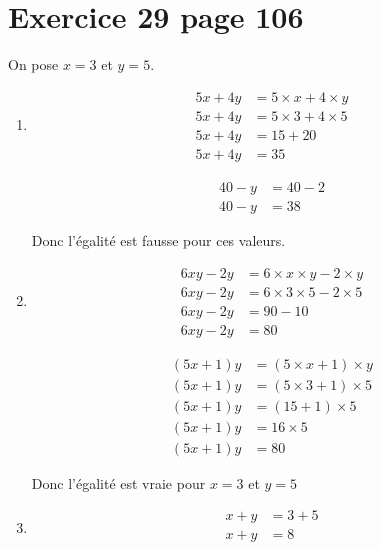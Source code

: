 \documentclass[12pt,a4paper]{article}
\begin{document}
\section*{Exercice 29 page 106}

On pose $x=3$ et $y=5$.

\begin{enumerate}
	\item 
	

	
	\begin{multicols}{2}
		\begin{align*}
			5x + 4y &= 5 \times x + 4 \times y \\
			5x + 4y &= 5 \times 3 + 4 \times 5 \\
			5x + 4y &= 15 + 20 \\
			5x + 4y &= 35 
		\end{align*}
		
		\begin{align*}
			40 - y &= 40 - 2 \\
			40 - y &= 38 
		\end{align*}
	\end{multicols}
	
	Donc l'égalité est fausse pour ces valeurs.
	
	
	\item 
	\begin{multicols}{2}
		\begin{align*}
			6xy - 2y &= 6 \times x \times y - 2 \times y \\
			6xy - 2y &= 6 \times 3 \times 5 - 2 \times 5 \\
			6xy - 2y &= 90 - 10 \\
			6xy - 2y &= 80 
		\end{align*}
		
		\begin{align*}
			(5x+1)y &= (5 \times x+1) \times y \\
			(5x+1)y &= (5 \times 3+1) \times 5 \\
			(5x+1)y &= (15 +1) \times 5 \\
			(5x+1)y &= 16 \times 5 \\
			(5x+1)y &= 80 
		\end{align*}
	\end{multicols}
	
	Donc l'égalité est vraie pour $x=3$ et $y=5$
	
	
	\newpage
	
	\item 
	\begin{multicols}{2}
		\begin{align*}
			x + y &= 3 + 5 \\
			x + y &= 8 \\
		\end{align*}
		

\end{multicols}
\end{enumerate}
\end{document}
